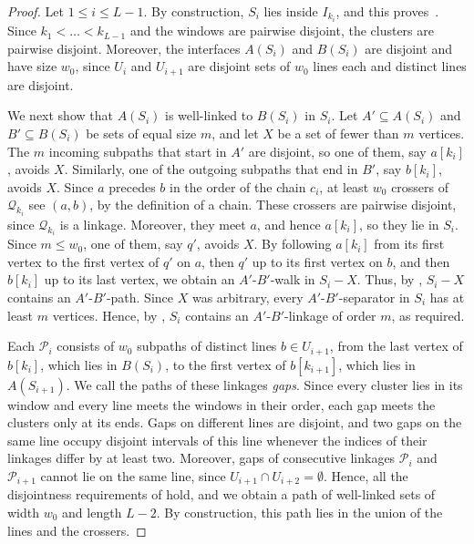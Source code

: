\documentclass[fontsize=12pt,leading=14pt]{fullpaper}
\newcommand{\Pcal}{\mathcal{P}}
\newcommand{\Qcal}{\mathcal{Q}}
\begin{document}
\begin{proof}
  Let $1\le i\le L-1$.
  By construction, $S_i$ lies inside $I_{k_i}$, and this proves~.
  Since $k_1<\dots<k_{L-1}$ and the windows are pairwise disjoint, the clusters are pairwise disjoint.
  Moreover, the interfaces $A(S_i)$ and $B(S_i)$ are disjoint and have size $w_0$, since $U_i$ and $U_{i+1}$ are disjoint sets of $w_0$ lines each and distinct lines are disjoint.

  We next show that $A(S_i)$ is well-linked to $B(S_i)$ in $S_i$.
  Let $A'\subseteq A(S_i)$ and $B'\subseteq B(S_i)$ be sets of equal size $m$, and let $X$ be a set of fewer than $m$ vertices.
  The $m$ incoming subpaths that start in $A'$ are disjoint, so one of them, say $a[k_i]$, avoids $X$.
  Similarly, one of the outgoing subpaths that end in $B'$, say $b[k_i]$, avoids $X$.
  Since $a$ precedes $b$ in the order of the chain $c_i$, at least $w_0$ crossers of $\Qcal_{k_i}$ see $(a,b)$, by the definition of a chain.
  These crossers are pairwise disjoint, since $\Qcal_{k_i}$ is a linkage.
  Moreover, they meet $a$, and hence $a[k_i]$, so they lie in $S_i$.
  Since $m\le w_0$, one of them, say $q'$, avoids $X$.
  By following $a[k_i]$ from its first vertex to the first vertex of $q'$ on $a$, then $q'$ up to its first vertex on $b$, and then $b[k_i]$ up to its last vertex, we obtain an $A'$-$B'$-walk in $S_i-X$.
  Thus, by , $S_i-X$ contains an $A'$-$B'$-path.
  Since $X$ was arbitrary, every $A'$-$B'$-separator in $S_i$ has at least $m$ vertices.
  Hence, by , $S_i$ contains an $A'$-$B'$-linkage of order $m$, as required.

  Each $\Pcal_i$ consists of $w_0$ subpaths of distinct lines $b\in U_{i+1}$, from the last vertex of $b[k_i]$, which lies in $B(S_i)$, to the first vertex of $b[k_{i+1}]$, which lies in $A(S_{i+1})$.
  We call the paths of these linkages \emph{gaps}.
  Since every cluster lies in its window and every line meets the windows in their order, each gap meets the clusters only at its ends.
  Gaps on different lines are disjoint, and two gaps on the same line occupy disjoint intervals of this line whenever the indices of their linkages differ by at least two.
  Moreover, gaps of consecutive linkages $\Pcal_i$ and $\Pcal_{i+1}$ cannot lie on the same line, since $U_{i+1}\cap U_{i+2}=\emptyset$.
  Hence, all the disjointness requirements of  hold, and we obtain a path of well-linked sets of width $w_0$ and length $L-2$.
  By construction, this path lies in the union of the lines and the crossers.


\end{proof}
\end{document}

